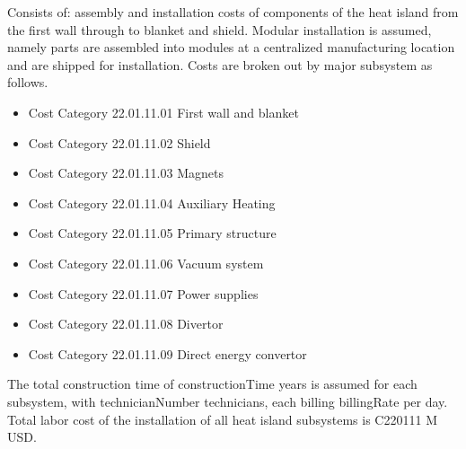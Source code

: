 
Consists of: assembly and installation costs of components of the heat island from the first wall through to blanket and shield. Modular installation is assumed, namely parts are assembled into modules at a centralized manufacturing location and are shipped for installation. Costs are broken out by major subsystem as follows.

\begin{itemize}
    \item Cost Category 22.01.11.01 First wall and blanket
    \item Cost Category 22.01.11.02 Shield
    \item Cost Category 22.01.11.03 Magnets
    \item Cost Category 22.01.11.04 Auxiliary Heating
    \item Cost Category 22.01.11.05 Primary structure
    \item Cost Category 22.01.11.06 Vacuum system
    \item Cost Category 22.01.11.07 Power supplies
    \item Cost Category 22.01.11.08 Divertor
    \item Cost Category 22.01.11.09 Direct energy convertor
\end{itemize}

The total construction time of constructionTime years is assumed for each subsystem, with technicianNumber technicians, each billing billingRate per day.  Total labor cost of the installation of all heat island subsystems is C220111 M USD.